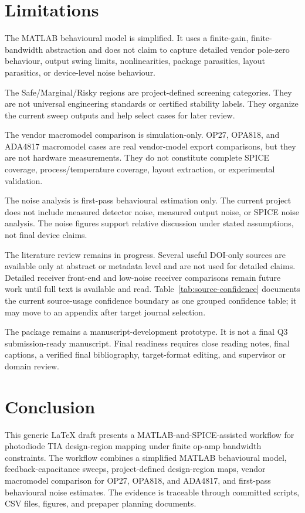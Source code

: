 \section{Limitations}

The MATLAB behavioural model is simplified. It uses a finite-gain, finite-bandwidth abstraction and does not claim to capture detailed vendor pole-zero behaviour, output swing limits, nonlinearities, package parasitics, layout parasitics, or device-level noise behaviour.

The Safe/Marginal/Risky regions are project-defined screening categories. They are not universal engineering standards or certified stability labels. They organize the current sweep outputs and help select cases for later review.

The vendor macromodel comparison is simulation-only. OP27, OPA818, and ADA4817 macromodel cases are real vendor-model export comparisons, but they are not hardware measurements. They do not constitute complete SPICE coverage, process/temperature coverage, layout extraction, or experimental validation.

The noise analysis is first-pass behavioural estimation only. The current project does not include measured detector noise, measured output noise, or SPICE noise analysis. The noise figures support relative discussion under stated assumptions, not final device claims.

The literature review remains in progress. Several useful DOI-only sources are available only at abstract or metadata level and are not used for detailed claims. Detailed receiver front-end and low-noise receiver comparisons remain future work until full text is available and read. Table~\ref{tab:source-confidence} documents the current source-usage confidence boundary as one grouped confidence table; it may move to an appendix after target journal selection.

The package remains a manuscript-development prototype. It is not a final Q3 submission-ready manuscript. Final readiness requires close reading notes, final captions, a verified final bibliography, target-format editing, and supervisor or domain review.

\section{Conclusion}

This generic LaTeX draft presents a MATLAB-and-SPICE-assisted workflow for photodiode TIA design-region mapping under finite op-amp bandwidth constraints. The workflow combines a simplified MATLAB behavioural model, feedback-capacitance sweeps, project-defined design-region maps, vendor macromodel comparison for OP27, OPA818, and ADA4817, and first-pass behavioural noise estimates. The evidence is traceable through committed scripts, CSV files, figures, and prepaper planning documents.

